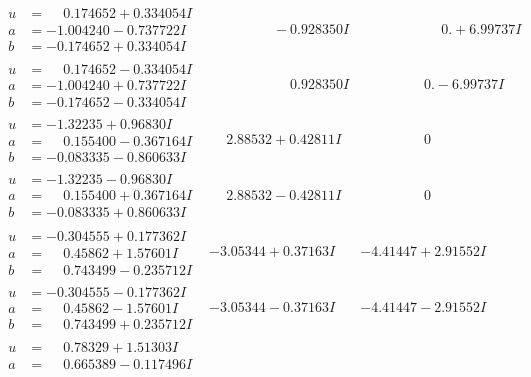 \documentclass[1p]{elsarticle_modified}
\theoremstyle{definition}
\begin{document}
$$\begin{array}{c|c|c}
 \hline 
\begin{aligned}
u &= \phantom{-}0.174652 + 0.334054 I \\
a &= -1.004240 - 0.737722 I \\
b &= -0.174652 + 0.334054 I\end{aligned}
 & \phantom{-0.000000 } -0.928350 I & \phantom{-0.000000 -}0. + 6.99737 I \\ \hline\begin{aligned}
u &= \phantom{-}0.174652 - 0.334054 I \\
a &= -1.004240 + 0.737722 I \\
b &= -0.174652 - 0.334054 I\end{aligned}
 & \phantom{-0.000000 -}0.928350 I & \phantom{-0.000000 } 0. - 6.99737 I \\ \hline\begin{aligned}
u &= -1.32235 + 0.96830 I \\
a &= \phantom{-}0.155400 - 0.367164 I \\
b &= -0.083335 - 0.860633 I\end{aligned}
 & \phantom{-}2.88532 + 0.42811 I & \phantom{-0.000000 } 0 \\ \hline\begin{aligned}
u &= -1.32235 - 0.96830 I \\
a &= \phantom{-}0.155400 + 0.367164 I \\
b &= -0.083335 + 0.860633 I\end{aligned}
 & \phantom{-}2.88532 - 0.42811 I & \phantom{-0.000000 } 0 \\ \hline\begin{aligned}
u &= -0.304555 + 0.177362 I \\
a &= \phantom{-}0.45862 + 1.57601 I \\
b &= \phantom{-}0.743499 - 0.235712 I\end{aligned}
 & -3.05344 + 0.37163 I & -4.41447 + 2.91552 I \\ \hline\begin{aligned}
u &= -0.304555 - 0.177362 I \\
a &= \phantom{-}0.45862 - 1.57601 I \\
b &= \phantom{-}0.743499 + 0.235712 I\end{aligned}
 & -3.05344 - 0.37163 I & -4.41447 - 2.91552 I \\ \hline\begin{aligned}
u &= \phantom{-}0.78329 + 1.51303 I \\
a &= \phantom{-}0.665389 - 0.117496 I \\

\end{aligned}
\end{array}$$
\end{document}
